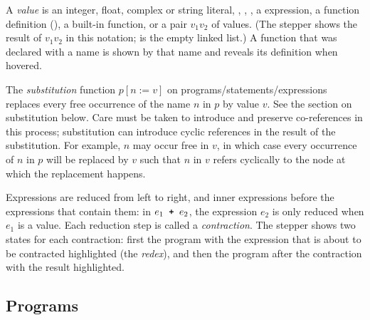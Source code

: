 A \emph{value} is an integer, float, complex or string literal,
, , ,
a  expression, a function definition
(), a built-in function, or a pair
\sCode{[}$v_1$\sCode{, }$v_2$\sCode{]} of values. (The stepper shows
the result of $v_1$\sCode{, }$v_2$\sCode{)} in this
notation;  is the empty linked list.) A function that was
declared with a name is shown by that name and reveals its definition
when hovered.

The \emph{substitution} function
$p [ n := v ]$ on programs/statements/expressions
replaces every free occurrence of the name $n$
in $p$ by value $v$. See the section on substitution below. Care must be
taken to introduce and preserve
co-references in this process; substitution can introduce
cyclic references in the result of the substitution. For example,
$n$ may occur free in $v$, in which case
every occurrence of $n$ in $p$
will be replaced by $v$ such that $n$ in $v$ refers cyclically
to the node at which the replacement happens.

Expressions are reduced from left to right, and inner expressions
before the expressions that contain them: in
$e_1 \textbf{\texttt{ + }} e_2$, the expression $e_2$ is only reduced when $e_1$
is a value. Each reduction step is called a \emph{contraction}. The
stepper shows two states for each contraction: first the program
with the expression that is about to be contracted highlighted
(the \emph{redex}), and then the program after the contraction with
the result highlighted.

\subsection*{Programs}




